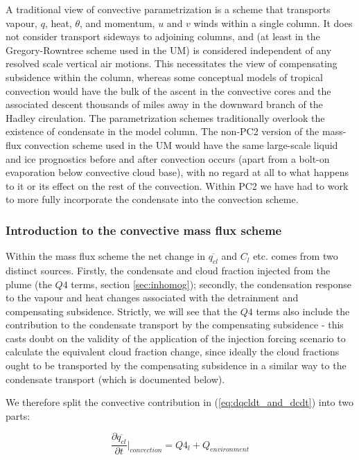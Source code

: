 \documentclass{UMDP_article}
\begin{document}
A traditional view of convective parametrization is a scheme that
transports vapour, $q$,
heat, $\theta$, and momentum, $u$ and $v$ winds within a single column. It
does not consider transport sideways to adjoining columns, and (at least
in the Gregory-Rowntree scheme used in the UM) is considered independent of
any resolved scale vertical air motions. This necessitates the view of
compensating subsidence within the column, whereas some conceptual models
of tropical convection would have the bulk of the ascent in the
convective cores and the
associated descent thousands of miles away in the downward branch of the
Hadley circulation. The parametrization schemes traditionally overlook the
existence of condensate in the model column. The non-PC2 version
of the mass-flux convection scheme used in the UM would have the same
large-scale liquid and ice prognostics before and after convection occurs
(apart from a bolt-on evaporation below convective cloud base), with no
regard at all to what happens to it or its effect on the rest of the
convection. Within PC2 we have had to work to more fully incorporate
the condensate into the convection scheme.

\subsubsection{Introduction to the convective mass flux scheme}

Within the mass flux scheme the net change in
$\overline{q_{cl}}$ and $C_l$ etc.
comes from two distinct sources. Firstly, the condensate and cloud
fraction injected from the plume (the $Q4$ terms, section \ref{sec:inhomog});
secondly, the condensation response to the vapour and heat changes associated
with the detrainment and compensating subsidence. Strictly, we will see that the
$Q4$ terms also include the contribution to the condensate transport
by the compensating subsidence - this casts doubt on the validity of
the application of the injection forcing scenario to calculate the
equivalent cloud fraction change, since ideally the cloud fractions
ought to be transported by the compensating subsidence in a similar
way to the condensate transport (which is documented below).

We therefore split the convective contribution in (\ref{eq:dqcldt_and_dcdt})
into two parts:

\begin{equation}
\frac{\partial \overline{q_{cl}}}{\partial t} |_{convection} =
Q4_l + Q_{environment}
\label{eq:inhomg_plus_homog}
\end{equation}
\end{document}
